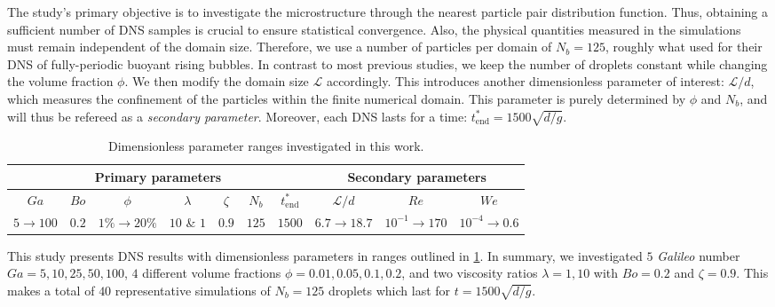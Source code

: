 

The study's primary objective is to investigate the microstructure through the nearest particle pair distribution function.
Thus, obtaining a sufficient number of DNS samples is crucial to ensure statistical convergence. 
Also, the physical quantities measured in the simulations must remain independent of the domain size. 
Therefore, we use a number of particles per domain of $N_b = 125$, roughly what \citet{hidman2023assessing} used for their DNS of fully-periodic buoyant rising bubbles.
In contrast to most previous studies, we keep the number of droplets constant while changing the volume fraction $\phi$. 
We then modify the domain size $\mathcal{L}$ accordingly. 
This introduces another dimensionless parameter of interest: $\mathcal{L}/d$, which measures the confinement of the particles within the finite numerical domain. 
This parameter is purely determined by $\phi$ and $N_b$, and will thus be refereed as a \textit{secondary parameter}.
Moreover, each DNS lasts for a time: $t^*_\text{end} = 1500 \sqrt{d/g}$.
\begin{table}[h!]
    \centering
    \caption{Dimensionless parameter ranges investigated in this work.}
    \begin{tabular}{|ccccccc|ccc|}\hline
        \multicolumn{7}{|c|}{Primary parameters}&\multicolumn{3}{|c|}{Secondary parameters}\\\hline\hline
        $Ga$&$Bo$&$\phi$&$\lambda$&$\zeta$&$N_b$&$t^*_\text{end}$&$\mathcal{L}/d$&$Re$&$We$\\ \hline
        $5\rightarrow 100$&$0.2$&$1\% \rightarrow 20\%$&$10$ \& $1$&$0.9$&$125$&$1500$&$6.7\to 18.7$&$10^{-1}\to 170$&$10^{-4}\to 0.6$\\ \hline
    \end{tabular}
    \label{tab:simulations}
\end{table}
This study presents DNS results with dimensionless parameters in ranges outlined in \ref{tab:simulations}.
In summary, we investigated $5$ \textit{Galileo} number $Ga = 5,10,25,50,100$, $4$ different volume fractions $\phi = 0.01,0.05,0.1,0.2$, and two viscosity ratios $\lambda =1,10$ with $Bo = 0.2$ and $\zeta = 0.9$. %
This makes a total of $40$ representative simulations of $N_b = 125$ droplets which last for $t= 1500 \sqrt{d/g}$. 


